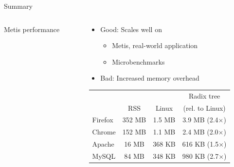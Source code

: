 \documentclass[aspectratio=169]{beamer}
\newcommand{\bi}{\begin{itemize}}
\newcommand{\ei}{\end{itemize}}
\begin{document}
\begin{frame}{Summary}
  \begin{columns}[T]
    \begin{column}{0.5\textwidth}
      \begin{center}
        Metis performance\\
        
      \end{center}
    \end{column}
    \begin{column}{0.5\textwidth}
      \bi
    \item {\color{green}Good}: Scales well on
      \bi
    \item Metis, real-world application
    \item Microbenchmarks
      \ei
    \item {\color{red}Bad}: Increased memory overhead
      \ei
    \begin{tabular}{ l | c | c | c }
              &        &         & Radix tree \\
              & RSS    & Linux   & (rel. to Linux) \\
      \hline
      Firefox & 352 MB & 1.5 MB  & 3.9 MB (2.4$\times$) \\
      Chrome  & 152 MB & 1.1 MB  & 2.4 MB (2.0$\times$) \\
      Apache  & 16 MB  & 368 KB  & 616 KB (1.5$\times$) \\
      MySQL   & 84 MB  & 348 KB  & 980 KB (2.7$\times$) \\
    \end{tabular}
    \end{column}
  \end{columns}
\end{frame}



\end{document}
